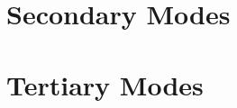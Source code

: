 \documentclass[12pt]{report}
\begin{document}
\part{Secondary Modes} \label{Secondary Modes}



\part{Tertiary Modes} \label{Tertiary Modes}








\end{document}

